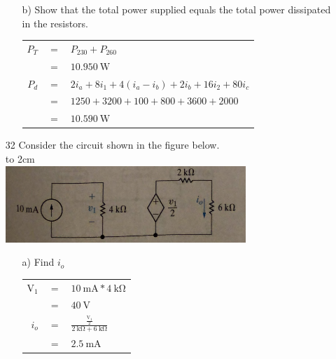 \documentclass[a4paper]{article}
\begin{document}
\begin{itemize}
\begin{itemize}
\begin{tabular}{r c l}
	      	      \end{tabular} 
	      	\item[b)] Show that the total power supplied equals the total power dissipated in the resistors. \\
	      	      \begin{tabular}{r c l}
	      	      	$P_{T}$ & $=$ & $P_{230} + P_{260}$                                               \\
	      	      	        & $=$ & $\SI{10,950}{\watt}$                                              \\
	      	      	$P_{d}$ & $=$ & $2i_{a} + 8i_{1} + 4(i_{a} - i_{b}) + 2i_{b} + 16i_{2} + 80i_{c}$ \\
	      	      	        & $=$ & $1250 + 3200 + 100 + 800 + 3600 + 2000$                           \\		
	      	      	        & $=$ & $\SI{10,590}{\watt}$                                              \\
	      	      \end{tabular}  
	      \end{itemize}
	\item[32] Consider the circuit shown in the figure below. \\
	      \hbox to 2cm{} \\	  
	      \includegraphics{P2-32.png} \\	  
	      \begin{itemize}
	      	\item[a)] Find $i_{o}$ \\
	      	      \begin{tabular}{r c l}
	      	      	$\si{\volt}_{1}$ & $=$ & $\SI{10}{\milli\ampere} * \SI{4}{\kilo\ohm}$                             \\
	      	      	                 & $=$ & $\SI{40}{\volt}$                                                         \\
	      	      	$i_{o}$          & $=$ & $\frac{\frac{\si{\volt}_{1}}{2}}{\SI{2}{\kilo\ohm} + \SI{6}{\kilo\ohm}}$ \\		
	      	      	                 & $=$ & $\SI{2.5}{\milli\ampere}$                                                \\

\end{tabular}
\end{itemize}
\end{itemize}
\end{document}
